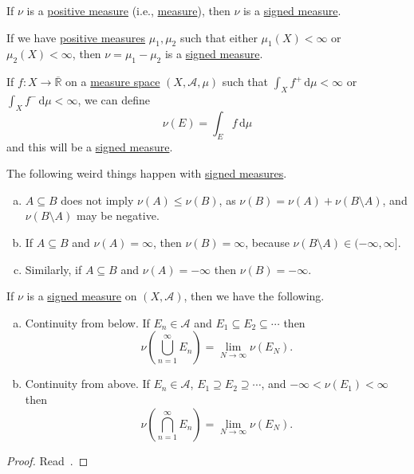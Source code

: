\begin{eg}
	If \(\nu\) is a \hyperref[def:signed-measure]{positive measure} (i.e., \hyperref[def:measure]{measure}), then \(\nu\) is a \hyperref[def:signed-measure]{signed measure}.
\end{eg}

\begin{eg}
	If we have \hyperref[def:signed-measure]{positive measures} \(\mu_1,\mu_2\) such that either \(\mu_1(X) < \infty\) or \(\mu_2(X) < \infty\), then \(\nu = \mu_1 - \mu_2\) is a \hyperref[def:signed-measure]{signed measure}.
\end{eg}

\begin{eg}
	If \(f \colon X \to \overline{\mathbb{R}}\) on a \hyperref[def:measure-space]{measure space} \((X,\mathcal{A},\mu)\) such that \(\int_X f^+ \,\mathrm{d} \mu < \infty\) or \(\int_X f^- \,\mathrm{d} \mu < \infty\), we can define
	\[
		\nu(E) = \int_E f \,\mathrm{d} \mu
	\]
	and this will be a \hyperref[def:signed-measure]{signed measure}.
\end{eg}

\begin{note}
	The following weird things happen with \hyperref[def:signed-measure]{signed measures}.
	\begin{enumerate}[(a)]
		\item \(A \subseteq B\) does not imply \(\nu(A) \leq \nu(B)\), as \(\nu(B) = \nu(A) + \nu(B \setminus A)\), and \(\nu(B \setminus A)\) may be negative.
		\item If \(A \subseteq B\) and \(\nu(A) = \infty\), then \(\nu(B) = \infty\), because \(\nu(B \setminus A) \in (-\infty,\infty]\).
		\item Similarly, if \(A \subseteq B\) and \(\nu(A) = -\infty\) then \(\nu(B) = -\infty\).
	\end{enumerate}
\end{note}

\begin{lemma}\label{lemma:signed-cont-above-below}
	If \(\nu\) is a \hyperref[def:signed-measure]{signed measure} on \((X, \mathcal{A})\), then we have the following.
	\begin{enumerate}[(a)]
		\item\label{lma:signed-continuity-from-below} Continuity from below. If \(E_n \in \mathcal{A}\) and \(E_1 \subseteq E_2 \subseteq \cdots\) then
		      \[
			      \nu\left( \bigcup_{n=1}^\infty E_n \right)  = \lim_{N \to \infty} \nu(E_N).
		      \]
		\item\label{lma:signed-continuity-from-above} Continuity from above. If \(E_n \in \mathcal{A}\), \(E_1 \supseteq E_2 \supseteq \cdots\),
		      and \(-\infty < \nu(E_1) < \infty\) then
		      \[
			      \nu\left( \bigcap_{n=1}^\infty E_n \right)  = \lim_{N \to \infty} \nu(E_N).
		      \]
	\end{enumerate}
\end{lemma}
\begin{proof}
	Read~\cite{folland1999real}.
\end{proof}

